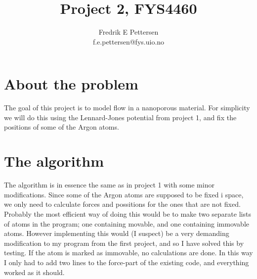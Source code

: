 \documentclass[a4paper,english, 10pt, twoside]{article}
\title{Project 2, FYS4460}
\author{Fredrik E Pettersen\\ f.e.pettersen@fys.uio.no}
\begin{document}
\maketitle

\newpage
\tableofcontents
\newpage


\section{About the problem}
The goal of this project is to model flow in a nanoporous material. For simplicity we will do this using 
the Lennard-Jones potential from project 1, and fix the positions of some of the Argon atoms.

\section{The algorithm}
The algorithm is in essence the same as in project 1 with some minor modifications. Since some of the 
Argon atoms are supposed to be fixed i space, we only need to calculate forces and possitions for the 
ones that are not fixed. Probably the most efficient way of doing this would be to make two separate lists 
of atoms in the program; one containing movable, and one containing immovable atoms. However implementing 
this would (I suspect) be a very demanding modification to my program from the first project, and so I have 
solved this by testing. If the atom is marked as immovable, no calculations are done. In this way I only 
had to add two lines to the force-part of the existing code, and everything worked as it should.
\end{document}
